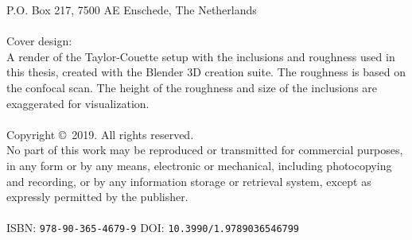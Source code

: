 P.O. Box 217, 7500 AE Enschede, The Netherlands\\
\vspace{-2mm}\\
Cover design:\\
A render of the Taylor-Couette setup with the inclusions and roughness used in
this thesis, created with the Blender 3D creation suite. The roughness is
based on the confocal scan. The height of the roughness and size of the
inclusions are exaggerated for visualization. \\
\vspace{-2mm}\\
\noindent Copyright \copyright~2019. All rights reserved.\\
\noindent No part of this work may be reproduced or transmitted for commercial
purposes, in any form or by any means, electronic or mechanical, including
photocopying and recording, or by any information storage or retrieval system,
except as expressly permitted by the publisher.\\
\vspace{-2mm}\\
\noindent ISBN: \texttt{978-90-365-4679-9} \hfill DOI: \texttt{10.3990/1.9789036546799}
\newpage
\thispagestyle{empty}
\vspace{1cm}
